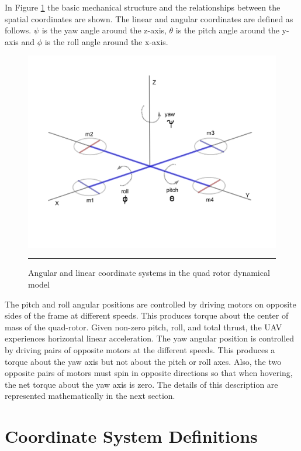  In Figure \ref{fig:Quad-Rotor Coordinate System} the basic mechanical structure and the relationships between the spatial coordinates are shown. The linear and angular coordinates are defined as follows. $ \psi $ is the yaw angle around the z-axis, $ \theta $ is the pitch angle around the y-axis and $ \phi $ is the roll angle around the x-axis.\\
\begin{figure}[htbp]
  \centering
    \includegraphics[scale = 0.5]{Figures/coords.png}
    \rule{35em}{0.5pt}
  \caption[Quad-Rotor Coordinate System]{Angular and linear coordinate systems in the quad rotor dynamical model}
  \label{fig:Quad-Rotor Coordinate System}
\end{figure}

 The pitch and roll angular positions are controlled by driving motors on opposite sides of the frame at different speeds. This produces torque about the center of mass of the quad-rotor. Given non-zero pitch, roll, and total thrust, the UAV experiences horizontal linear acceleration. The yaw angular position is controlled by driving pairs of opposite motors at the different speeds. This produces a torque about the yaw axis but not about the pitch or roll axes. Also, the two opposite pairs of motors must spin in opposite directions so that when hovering, the net torque about the yaw axis is zero. The details of this description are represented mathematically in the next section.



\section{Coordinate System Definitions}

